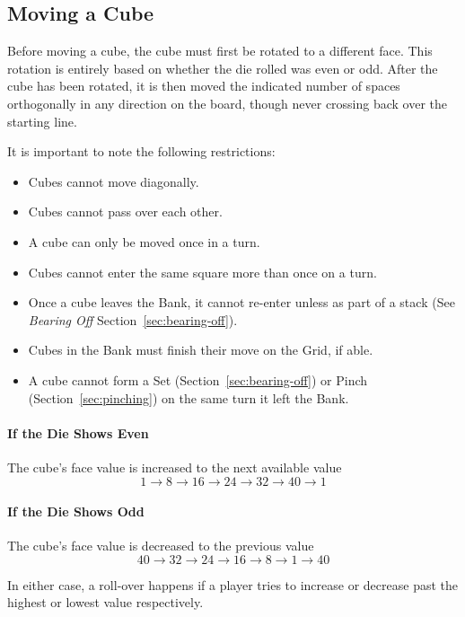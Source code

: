 \subsection{Moving a Cube}
Before moving a cube, the cube must first be rotated to a different face.
This rotation is entirely based on whether the die rolled was even or odd.
After the cube has been rotated, it is then moved the indicated number of spaces orthogonally in any direction on the board, though never crossing back over the starting line.

It is important to note the following restrictions:
\begin{itemize}
    \item Cubes cannot move diagonally.
    \item Cubes cannot pass over each other.
    \item A cube can only be moved once in a turn.
    \item Cubes cannot enter the same square more than once on a turn.
    \item Once a cube leaves the Bank, it cannot re-enter unless as part of a stack (See \textit{Bearing Off} Section~\ref{sec:bearing-off}).
    \item Cubes in the Bank must finish their move on the Grid, if able.
    \item A cube cannot form a Set (Section~\ref{sec:bearing-off}) or Pinch (Section~\ref{sec:pinching}) on the same turn it left the Bank.
\end{itemize}

\paragraph{If the Die Shows Even} The cube's face value is increased to the next available value
$$1 \to 8 \to 16 \to 24 \to 32 \to 40 \to 1$$
\paragraph{If the Die Shows Odd} The cube's face value is decreased to the previous value
$$40 \to 32 \to 24 \to 16 \to 8 \to 1 \to 40$$

\note In either case, a roll-over happens if a player tries to increase or decrease past the highest or lowest value respectively.

